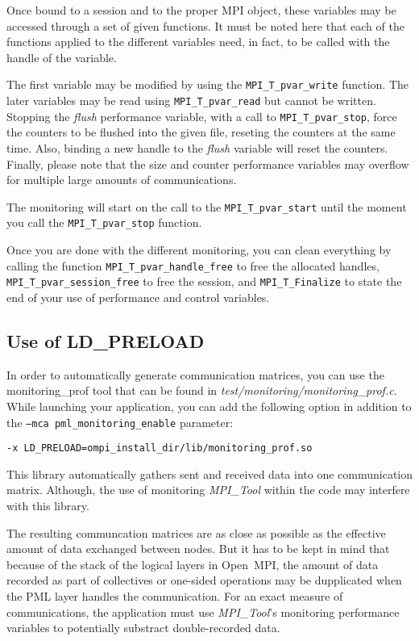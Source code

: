 \documentclass[notitlepage]{article}
\newcommand{\mpit}[1]{\textit{MPI\_Tool#1}}
\begin{document}
Once bound to a session and to the proper MPI object, these variables
may be accessed through a set of given functions. It must be noted
here that each of the functions applied to the different variables
need, in fact, to be called with the handle of the variable.

The first variable may be modified by using the
\texttt{MPI\_T\_pvar\_write} function. The later variables may be read
using \texttt{MPI\_T\_pvar\_read} but cannot be written. Stopping the
\textit{flush} performance variable, with a call to
\texttt{MPI\_T\_pvar\_stop}, force the counters to be flushed into the
given file, reseting the counters at the same time. Also, binding a
new handle to the \textit{flush} variable will reset the
counters. Finally, please note that the size and counter performance
variables may overflow for multiple large amounts of communications.

The monitoring will start on the call to the
\texttt{MPI\_T\_pvar\_start} until the moment you call the
\texttt{MPI\_T\_pvar\_stop} function.

Once you are done with the different monitoring, you can clean
everything by calling the function \texttt{MPI\_T\_pvar\_handle\_free}
to free the allocated handles, \texttt{MPI\_T\_pvar\_session\_free} to
free the session, and \texttt{MPI\_T\_Finalize} to state the end of
your use of performance and control variables.

\subsection{Use of \textsc{LD_PRELOAD}}

In order to automatically generate communication matrices, you can use
the monitoring_prof tool that can be found in
\textit{test/monitoring/monitoring_prof.c}. While launching your
application, you can add the following option in addition to the
\texttt{--mca pml\_monitoring\_enable} parameter:
\begin{description}
\item [\texttt{-x LD_PRELOAD=ompi_install_dir/lib/monitoring_prof.so}]
\end{description}

This library automatically gathers sent and received data into one
communication matrix. Although, the use of monitoring \mpit{} within
the code may interfere with this library.

The resulting communcation matrices are as close as possible as the
effective amount of data exchanged between nodes. But it has to be
kept in mind that because of the stack of the logical layers in
Open~MPI, the amount of data recorded as part of collectives or
one-sided operations may be dupplicated when the PML layer handles the
communication. For an exact measure of communications, the application
must use \mpit{}'s monitoring performance variables to potentially
substract double-recorded data.
\end{document}
